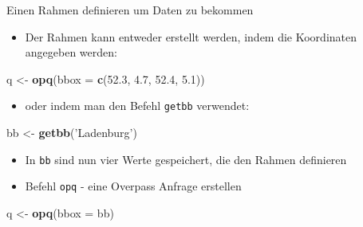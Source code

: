 \documentclass[ignorenonframetext,]{beamer}
\newenvironment{Shaded}{\begin{snugshade}}{\end{snugshade}}
\newcommand{\KeywordTok}[1]{\textcolor[rgb]{0.13,0.29,0.53}{\textbf{#1}}}
\newcommand{\DataTypeTok}[1]{\textcolor[rgb]{0.13,0.29,0.53}{#1}}
\newcommand{\FloatTok}[1]{\textcolor[rgb]{0.00,0.00,0.81}{#1}}
\newcommand{\StringTok}[1]{\textcolor[rgb]{0.31,0.60,0.02}{#1}}
\newcommand{\NormalTok}[1]{#1}
\providecommand{\tightlist}{%
  \setlength{\itemsep}{0pt}\setlength{\parskip}{0pt}}
\begin{document}
\begin{frame}[fragile]{Einen Rahmen definieren um Daten zu bekommen}

\begin{itemize}
\tightlist
\item
  Der Rahmen kann entweder erstellt werden, indem die Koordinaten
  angegeben werden:
\end{itemize}

\begin{Shaded}
\begin{Highlighting}[]
\NormalTok{q <-}\StringTok{ }\KeywordTok{opq}\NormalTok{(}\DataTypeTok{bbox =} \KeywordTok{c}\NormalTok{(}\FloatTok{52.3}\NormalTok{, }\FloatTok{4.7}\NormalTok{, }\FloatTok{52.4}\NormalTok{, }\FloatTok{5.1}\NormalTok{))}
\end{Highlighting}
\end{Shaded}

\begin{itemize}
\tightlist
\item
  oder indem man den Befehl \texttt{getbb} verwendet:
\end{itemize}

\begin{Shaded}
\begin{Highlighting}[]
\NormalTok{bb <-}\StringTok{ }\KeywordTok{getbb}\NormalTok{(}\StringTok{'Ladenburg'}\NormalTok{)}
\end{Highlighting}
\end{Shaded}

\begin{itemize}
\item
  In \texttt{bb} sind nun vier Werte gespeichert, die den Rahmen
  definieren
\item
  Befehl \texttt{opq} - eine Overpass Anfrage erstellen
\end{itemize}

\begin{Shaded}
\begin{Highlighting}[]
\NormalTok{q <-}\StringTok{ }\KeywordTok{opq}\NormalTok{(}\DataTypeTok{bbox =}\NormalTok{ bb)}
\end{Highlighting}
\end{Shaded}

\end{frame}
\end{document}
